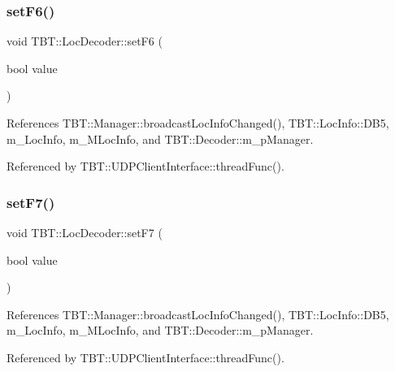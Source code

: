 \subsubsection{\texorpdfstring{set\+F6()}{setF6()}}
{\footnotesize\ttfamily void T\+B\+T\+::\+Loc\+Decoder\+::set\+F6 (\begin{DoxyParamCaption}\item[{bool}]{value }\end{DoxyParamCaption})\hspace{0.3cm}{\ttfamily [inline]}}



References T\+B\+T\+::\+Manager\+::broadcast\+Loc\+Info\+Changed(), T\+B\+T\+::\+Loc\+Info\+::\+D\+B5, m\+\_\+\+Loc\+Info, m\+\_\+\+M\+Loc\+Info, and T\+B\+T\+::\+Decoder\+::m\+\_\+p\+Manager.



Referenced by T\+B\+T\+::\+U\+D\+P\+Client\+Interface\+::thread\+Func().

\mbox{\label{classTBT_1_1LocDecoder_a16a3659cd9a64be4b6ef43b499004434_a16a3659cd9a64be4b6ef43b499004434}} 
\subsubsection{\texorpdfstring{set\+F7()}{setF7()}}
{\footnotesize\ttfamily void T\+B\+T\+::\+Loc\+Decoder\+::set\+F7 (\begin{DoxyParamCaption}\item[{bool}]{value }\end{DoxyParamCaption})\hspace{0.3cm}{\ttfamily [inline]}}



References T\+B\+T\+::\+Manager\+::broadcast\+Loc\+Info\+Changed(), T\+B\+T\+::\+Loc\+Info\+::\+D\+B5, m\+\_\+\+Loc\+Info, m\+\_\+\+M\+Loc\+Info, and T\+B\+T\+::\+Decoder\+::m\+\_\+p\+Manager.



Referenced by T\+B\+T\+::\+U\+D\+P\+Client\+Interface\+::thread\+Func().

\mbox{\label{classTBT_1_1LocDecoder_a6a65d02e101d91142ce48587c9c905cf_a6a65d02e101d91142ce48587c9c905cf}} 
